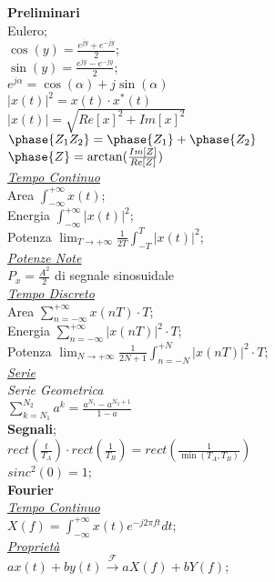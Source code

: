 \documentclass[a4paper]{article}
\begin{document}
\begin{multicols*}{2} 
\textbf{Preliminari} \\
Eulero; \\
$\cos(y)=\frac{e^{jy} + e^{-jy}}{2}$; \\
$\sin(y)=\frac{e^{jy} - e^{-jy}}{2}$; \\
$e^{j\alpha}=\cos(\alpha)+j\sin(\alpha)$ \\
$|x(t)|^2=x(t)\cdot x^*(t)$\\
$|x(t)|=\sqrt{{Re[x]}^{2} + {Im[x]}^{2}}$ \\
$\phase{Z_1 Z_2} = \phase{Z_1}+\phase{Z_2}$ \\
$\phase{Z}=\arctan(\frac{Im[Z]}{Re[Z]})$ \\
\underline{\textit{Tempo Continuo}} \\
Area $\int_{-\infty}^{+\infty} x(t)$; \\
Energia $\int_{-\infty}^{+\infty} |x(t)|^2$; \\
Potenza 
$\lim_{T \to +\infty}\frac{1}{2T}\int_{-T}^{T}|x(t)|^2$; \\
\underline{\textit{Potenze Note}} \\
$P_x=\frac{{A}^{2}}{2}$ di segnale sinosuidale\\
\underline{\textit{Tempo Discreto}} \\
Area $\sum_{n=-\infty}^{+\infty} x(nT) \cdot T$; \\
Energia $\sum_{n=-\infty}^{+\infty}|x(nT)|^2\cdot T$; \\
Potenza
$\lim_{N \to +\infty}{\frac{1}{2N + 1}\int_{n=-N}^{+N}|x(nT)|^2\cdot T}$; \\
\underline{\textit{Serie}} \\
\textit{Serie Geometrica}\\
$\sum_{k=N_1}^{N_2}a^k=\frac{a^{N_1}-a^{N_2 + 1}}{1-a}$\\
\textbf{Segnali}; \\
$rect(\frac{t}{T_A})\cdot rect(\frac{1}{T_B})=rect(\frac{1}{\min(T_A,T_B)})$ \\
$sinc^2(0) = 1$;\\
\textbf{Fourier} \\
\underline{\textit{Tempo Continuo}} \\
$X(f) = \int_{-\infty}^{+\infty} x(t) e^{-j2\pi ft} dt$; \\
\underline{\textit{Proprietà}} \\
$ax(t) + by(t) \xrightarrow{\mathscr{F}} aX(f) + bY(f)$; \\

\end{multicols*}
\end{document}
